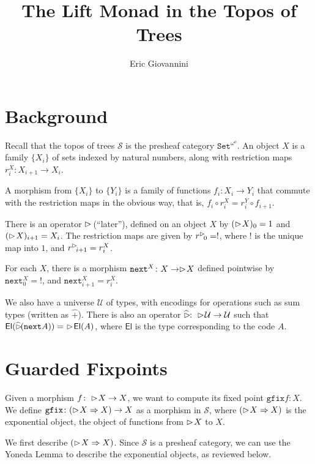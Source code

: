 \documentclass{article}
\newcommand{\later}{\vartriangleright\hspace{-2px}}
\newcommand{\nxt}{\texttt{next}}
\newcommand{\calS}{\mathcal{S}}
\newcommand{\gfix}{\texttt{gfix}}
\newcommand{\calU}{\mathcal{U}}
\newcommand{\laterhat}{\widehat{\later}}
\newcommand{\El}{\mathsf{El}}
\newcommand{\To}{\Rightarrow}
\newcommand{\Set}{\texttt{Set}}
\begin{document}
\title{The Lift Monad in the Topos of Trees}
\author{Eric Giovannini}

\maketitle

\section{Background}

Recall that the topos of trees $\calS$ is the presheaf category $\Set^{\omega^o}$. 
An object $X$ is a family $\{X_i\}$ of sets indexed by natural numbers, along with
restriction maps $r^X_i \colon X_{i+1} \to X_i$.

A morphism from $\{X_i\}$ to $\{Y_i\}$ is a family of functions $f_i \colon X_i \to Y_i$
that commute with the restriction maps in the obvious way, that is,
$f_i \circ r^X_i = r^Y_i \circ f_{i+1}$.

There is an operator $\later$ (``later''), defined on an object $X$ by
$(\later X)_0 = 1$ and $(\later X)_{i+1} = X_i$. The restriction maps are given by
$r^\later_0 = !$, where $!$ is the unique map into $1$, and $r^\later_{i+1} = r^X_i$.

For each $X$, there is a morphism $\nxt^X \colon X \to \later X$ defined pointwise by
$\nxt^X_0 = !$, and $\nxt^X_{i+1} = r^X_i$.


We also have a universe $\calU$ of types, with encodings for operations such as sum types
(written as $\widehat{+}$). There is also an operator $\laterhat \colon \later \calU \to \calU$ such that
$\El(\laterhat(\nxt A)) =\,\, \later \El(A)$, where $\El$ is the type corresponding to the code $A$.


\section{Guarded Fixpoints}

Given a morphism $f \colon \later X \to X$, we want to compute its fixed point $\gfix f : X$.
We define $\gfix \colon (\later X \To X) \to X$ as a morphism in $\calS$, where $(\later X \To X)$
is the exponential object, the object of functions from $\later X$ to $X$.

We first describe $(\later X \To X)$. Since $\calS$ is a presheaf category, we can use the
Yoneda Lemma to describe the exponential objects, as reviewed below.
\end{document}

